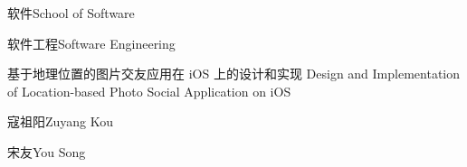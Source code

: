 
\school
{软件}{School of Software}

\major
{软件工程}{Software Engineering}

\thesistitle
{基于地理位置的图片交友应用在 iOS 上的设计和实现}
{}
{Design and Implementation of Location-based Photo Social Application on iOS}
{}

\thesisauthor
{寇祖阳}{Zuyang Kou}

\teacher
{宋友}{You Song}






